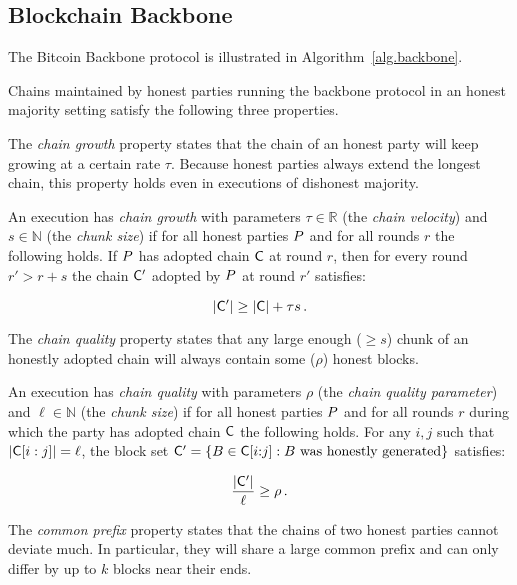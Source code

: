 \subsection{Blockchain Backbone}

The Bitcoin Backbone protocol is illustrated in Algorithm~\ref{alg.backbone}.




Chains maintained by honest parties running the backbone protocol in an honest
majority setting satisfy the following three properties.

The \emph{chain growth} property states that the chain of an honest party will
keep growing at a certain rate $\tau$. Because honest parties always extend the
longest chain, this property holds even in executions of dishonest majority.

\begin{definition}
  An execution has \emph{chain growth} with parameters $\tau \in \mathbb{R}$
  (the \emph{chain velocity}) and $s \in \mathbb{N}$ (the \emph{chunk size}) if
  for all honest parties $P$ and for all rounds $r$ the following holds. If
  $P$ has adopted chain $\mathsf{C}$ at round $r$, then for every round $r' > r
  + s$ the chain $\mathsf{C}'$ adopted by $P$ at round $r'$ satisfies:

  \[
  |\mathsf{C}'| \geq |\mathsf{C}| + \tau s
  \,.
  \]
\end{definition}

The \emph{chain quality} property states that any large enough ($\geq s$) chunk
of an honestly adopted chain will always contain some ($\rho$) honest blocks.

\begin{definition}
  An execution has \emph{chain quality} with parameters $\rho$ (the
  \emph{chain quality parameter}) and $\ell \in \mathbb{N}$ (the \emph{chunk size})
  if for all honest parties $P$ and for all rounds $r$ during which the
  party has adopted chain $\mathsf{C}$ the following holds. For any $i, j$ such that
  $|\mathsf{C}[i:j]| = \ell$, the block set $\mathsf{C}' = \{B \in \mathsf{C}[i{:}j]: B \text{
  was honestly generated}\}$ satisfies:

  \[
  \frac{|\mathsf{C}'|}{\ell} \geq \rho
  \,.
  \]
\end{definition}

The \emph{common prefix} property states that the chains of two honest parties
cannot deviate much. In particular, they will share a large common prefix and
can only differ by up to $k$ blocks near their ends.

